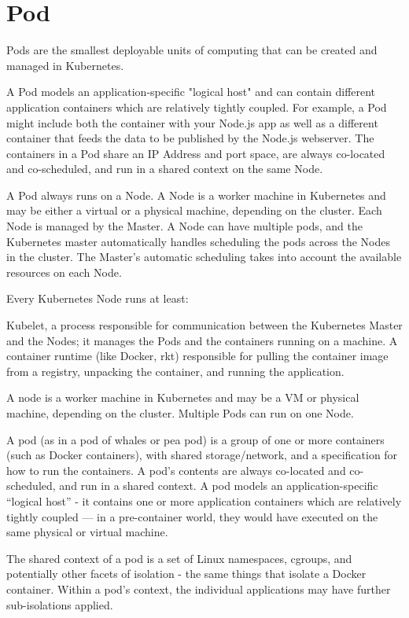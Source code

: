 \section{Pod}
\label{sec:kubernetes-pod}

Pods are the smallest deployable units of computing that can be created and managed in Kubernetes.

A Pod models an application-specific "logical host" and can contain different application containers which are relatively tightly coupled. For example, a Pod might include both the container with your Node.js app as well as a different container that feeds the data to be published by the Node.js webserver. The containers in a Pod share an IP Address and port space, are always co-located and co-scheduled, and run in a shared context on the same Node.

A Pod always runs on a Node. A Node is a worker machine in Kubernetes and may be either a virtual or a physical machine, depending on the cluster. Each Node is managed by the Master. A Node can have multiple pods, and the Kubernetes master automatically handles scheduling the pods across the Nodes in the cluster. The Master's automatic scheduling takes into account the available resources on each Node.

Every Kubernetes Node runs at least:

Kubelet, a process responsible for communication between the Kubernetes Master and the Nodes; it manages the Pods and the containers running on a machine.
A container runtime (like Docker, rkt) responsible for pulling the container image from a registry, unpacking the container, and running the application.

A node is a worker machine in Kubernetes and may be a VM or physical machine, depending on the cluster. Multiple Pods can run on one Node. 

A pod (as in a pod of whales or pea pod) is a group of one or more containers (such as Docker containers), with shared storage/network, and a specification for how to run the containers. A pod’s contents are always co-located and co-scheduled, and run in a shared context. A pod models an application-specific “logical host” - it contains one or more application containers which are relatively tightly coupled — in a pre-container world, they would have executed on the same physical or virtual machine.

The shared context of a pod is a set of Linux namespaces, cgroups, and potentially other facets of isolation - the same things that isolate a Docker container. Within a pod’s context, the individual applications may have further sub-isolations applied.

